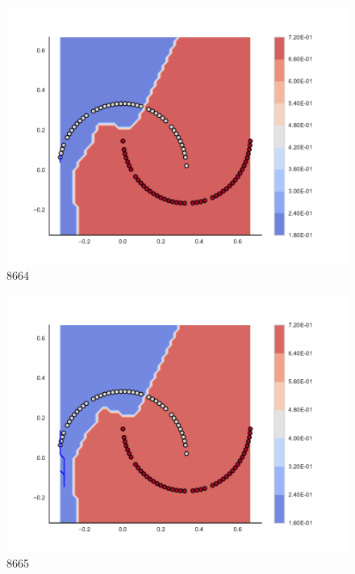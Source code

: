\begin{subfigure}[b]{0.09\textwidth}
    \includegraphics[clip, trim=2.35cm 1.75cm 4.5cm 0cm,width=\textwidth]{img/convergence/8664.pdf}
    \caption{8664}
    \label{fig:convergence_8664}
\end{subfigure}
%
\begin{subfigure}[b]{0.09\textwidth}
    \includegraphics[clip, trim=2.35cm 1.75cm 4.5cm 0cm,width=\textwidth]{img/convergence/8665.pdf}
    \caption{8665}
    \label{fig:convergence_8665}
\end{subfigure}
%
